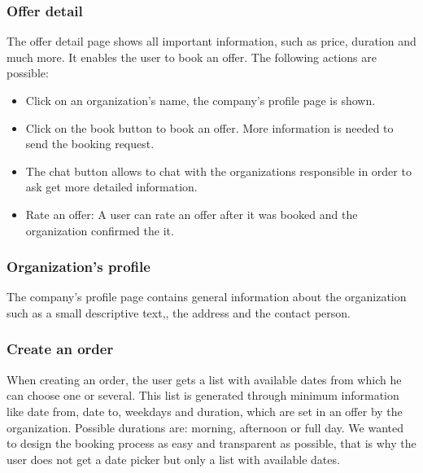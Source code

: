 \documentclass[11pt]{article} %
\begin{document}
\subsubsection{Offer detail}
The offer detail page shows all important information, such as price, duration and much more. It enables the user to book an offer.  The following actions are possible:\\

\begin{itemize}
  \item Click on an organization's name, the company's profile page is shown.
  \item Click on the book button to book an offer. More information is needed to send the booking request.
 \item The chat button allows to chat with the organizations responsible in order to ask get more detailed information.
 \item Rate an offer: A user can rate an offer after it was booked and the organization confirmed the it.
\end{itemize}

\subsubsection{Organization’s profile}
The company's profile page contains general information about the organization such as a small descriptive text,, the address and the contact person.

\subsubsection{Create an order}
When creating an order, the user gets a list with available dates from which he can choose one or several. This list is generated through minimum information like date from, date to, weekdays and duration, which are set in an offer by the organization. Possible durations are: morning, afternoon or full day. We wanted to design the booking process as easy and transparent as possible, that is why the user does not get a date picker but only a list with available dates. 
\end{document}
